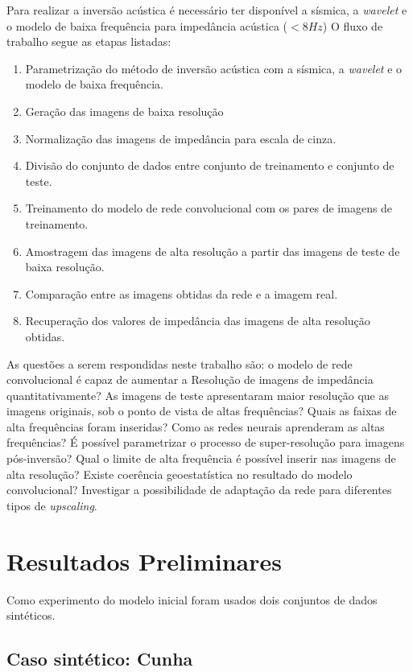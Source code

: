 Para realizar a inversão acústica é necessário ter disponível a sísmica, a \textit{wavelet}
e o modelo de baixa frequência para impedância acústica ($<8Hz$) %
O fluxo de trabalho segue as etapas listadas:
 
\begin{enumerate}
  \item Parametrização do método de inversão acústica com a sísmica, a \textit{wavelet} e o modelo de baixa frequência.
  \item Geração das imagens de baixa resolução
  \item Normalização das imagens de impedância para escala de cinza.
  \item Divisão do conjunto de dados entre conjunto de treinamento e conjunto de teste.
  \item Treinamento do modelo de rede convolucional com os pares de imagens de treinamento.
  \item Amostragem das imagens de alta resolução a partir das imagens de teste de baixa resolução.
  \item Comparação entre as imagens obtidas da rede e a imagem real.
  \item Recuperação dos valores de impedância das imagens de alta resolução obtidas.
\end{enumerate}

As questões a serem respondidas neste trabalho são: o modelo de rede convolucional é capaz de aumentar a Resolução de imagens de impedância
quantitativamente? As imagens de teste apresentaram maior resolução que as imagens originais, sob o ponto 
de vista de altas frequências? Quais as faixas de alta frequências foram inseridas? Como as redes neurais aprenderam
as altas frequências? É possível parametrizar o processo de super-resolução para imagens pós-inversão?
Qual o limite de alta frequência é possível inserir nas imagens de alta resolução? Existe coerência geoestatística
no resultado do modelo convolucional? Investigar a possibilidade de adaptação da rede para diferentes tipos de \textit{upscaling}.


\section{Resultados Preliminares}
Como experimento do modelo inicial foram usados dois conjuntos de dados sintéticos.


 
\subsection{Caso sintético: Cunha}


